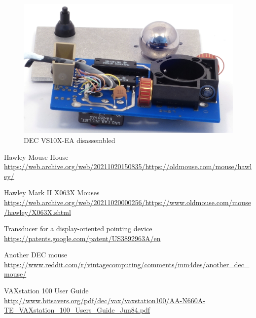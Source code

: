\documentclass[11pt, a4paper]{article}
\begin{document}
\begin{figure}[h]
    \centering
    \includegraphics[scale=1]{1983_dec_vs10x_ea_mouse/inside_30.jpg}
    \caption{DEC VS10X-EA disassembled}
    \label{fig:DecVS10XInside}
\end{figure}

\begin{thebibliography}{9}
 Hawley Mouse House \url{https://web.archive.org/web/20211020150835/https://oldmouse.com/mouse/hawley/}

 Hawley Mark II X063X Mouses \url{https://web.archive.org/web/20211020000256/https://www.oldmouse.com/mouse/hawley/X063X.shtml}

 Transducer for a display-oriented pointing device \url{https://patents.google.com/patent/US3892963A/en}

 Another DEC mouse \url{https://www.reddit.com/r/vintagecomputing/comments/mm4des/another_dec_mouse/}

 VAXstation 100 User Guide \url{http://www.bitsavers.org/pdf/dec/vax/vaxstation100/AA-N660A-TE_VAXstation_100_Users_Guide_Jun84.pdf}
\end{thebibliography}
\end{document}
